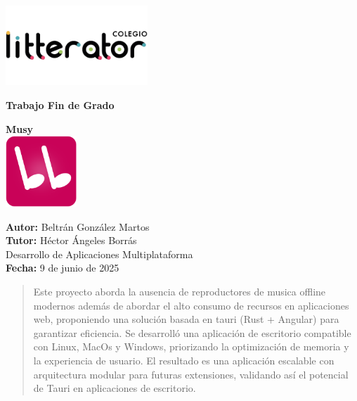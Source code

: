 \documentclass[11pt, a4paper]{article}
\begin{document}
\begin{titlepage}
    \centering

    \includegraphics[width=0.4\textwidth]{media/logo-litterator.png}

    \fontsize{26pt}{24pt}\selectfont \textbf{Trabajo Fin de Grado} \\
    \vspace{4.5cm}
    
    \fontsize{24pt}{24pt}\selectfont \textbf{Musy} \\
    \vspace{0.5cm}
    \includegraphics[width=0.2\textwidth]{media/Square310x310Logo.png} \\
    \vspace{2cm}

    \hfill
    \begin{minipage}{0.8\textwidth}
        \raggedleft
        \large
        \begin{spacing}{1.5}
            \textbf{Autor:} Beltrán González Martos \\
            \textbf{Tutor:} Héctor Ángeles Borrás \\
            Desarrollo de Aplicaciones Multiplataforma \\
            \textbf{Fecha:} 9 de junio de 2025
        \end{spacing}
    \end{minipage}

    


\end{titlepage}


\begin{abstract}
    Este proyecto aborda la ausencia de reproductores de musica offline modernos además de abordar el alto consumo de recursos en aplicaciones web, proponiendo una solución basada en tauri (Rust + Angular) para garantizar eficiencia. Se desarrolló una aplicación de escritorio compatible con Linux, MacOs y Windows, priorizando la optimización de memoria y la experiencia de usuario. El resultado es una aplicación escalable con arquitectura modular para futuras extensiones, validando así el potencial de Tauri en aplicaciones de escritorio.
\end{abstract}
\end{document}
